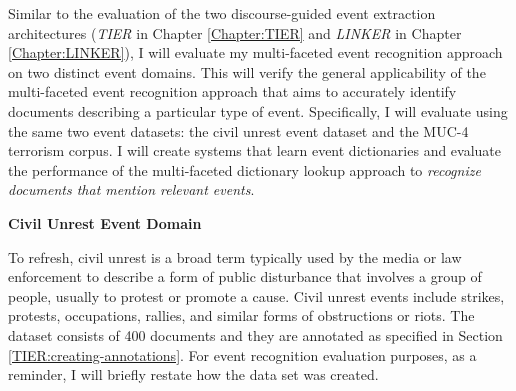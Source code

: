Similar to the evaluation of the two discourse-guided event extraction 
architectures ({\it TIER} in Chapter \ref{Chapter:TIER} and 
{\it LINKER} in Chapter \ref{Chapter:LINKER}), I will evaluate 
my multi-faceted event recognition approach on two distinct event domains.
This will verify the general applicability of the multi-faceted event recognition approach 
that aims to accurately 
identify documents describing a particular type of event. 
Specifically, I will evaluate using the same two event datasets:
the civil unrest event dataset and the MUC-4 terrorism corpus.
I will create systems that learn event dictionaries and 
evaluate the performance of the multi-faceted 
dictionary lookup approach 
to {\it recognize documents that mention relevant events}.

\vspace{.1in}
{\bf Civil Unrest Event Domain}
\vspace{.1in}

To refresh, civil unrest is a broad term  typically
used by the media or law enforcement to describe a form of public
disturbance that involves a group of people, usually to protest or promote a cause.
Civil unrest events include strikes, protests, occupations, rallies,
and similar forms of obstructions or riots. 
The dataset consists of 400 documents and they are annotated 
as specified in Section \ref{TIER:creating-annotations}. 
For event recognition evaluation purposes, 
as a reminder, I will briefly 
restate how the data set was created.

